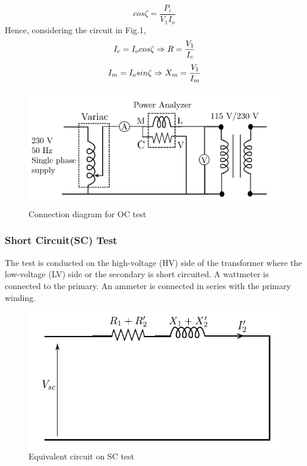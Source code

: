 \documentclass[12pt]{article}
\begin{document}
             $$cos\zeta=\dfrac{P_i}{V_1I_o}$$
             Hence, considering the circuit in Fig.1,$$I_c=I_ocos\zeta\\
             \Rightarrow R=\dfrac{V_1}{I_c}$$ $$I_m=I_osin\zeta\\
             \Rightarrow X_m=\dfrac{V_1}{I_m}$$
            \begin{figure}[H]
                \centering
                \includegraphics[width = 0.6\linewidth, height=2in]{LAB-2/oc.png}
                \caption{Connection diagram for OC test}
            \end{figure}
            
                
            
        \subsubsection{Short Circuit(SC) Test}
            The test is conducted on the high-voltage (HV) side of the transformer where
            the low-voltage (LV) side or the secondary is short circuited. A wattmeter is
            connected to the primary. An ammeter is connected in series with the primary
            winding.
            \begin{figure}[H]
                \centering
                \includegraphics[width = 0.6\linewidth]{LAB-2/SC_EQC.PNG}
                \caption{Equivalent circuit on SC test}
            \end{figure}
            
\end{document}
